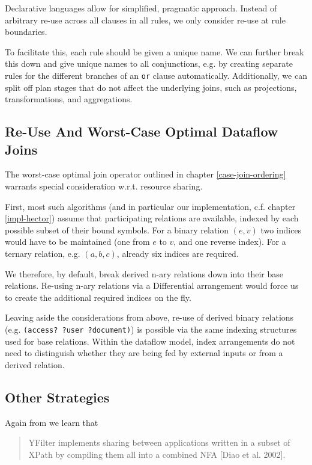 \documentclass[../catalog.tex]{subfiles}
\begin{document}
Declarative languages allow for simplified, pragmatic
approach. Instead of arbitrary re-use across all clauses in all rules,
we only consider re-use at rule boundaries.

To facilitate this, each rule should be given a unique name. We can
further break this down and give unique names to all conjunctions,
e.g. by creating separate rules for the different branches of an
\texttt{or} clause automatically. Additionally, we can split off plan
stages that do not affect the underlying joins, such as projections,
transformations, and aggregations.

\subsection{Re-Use And Worst-Case Optimal Dataflow Joins}

The worst-case optimal join operator outlined in chapter
\ref{case-join-ordering} warrants special consideration
w.r.t. resource sharing.

First, most such algorithms (and in particular our implementation,
c.f. chapter \ref{impl-hector}) assume that participating relations
are available, indexed by each possible subset of their bound
symbols. For a binary relation $(e,v)$ two indices would have to be
maintained (one from $e$ to $v$, and one reverse index). For a ternary
relation, e.g. $(a,b,c)$, already six indices are required.

We therefore, by default, break derived n-ary relations down into
their base relations. Re-using n-ary relations via a Differential
arrangement would force us to create the additional required indices
on the fly.

Leaving aside the considerations from above, re-use of derived binary
relations (e.g. \texttt{(access?  ?user ?document)}) is possible via
the same indexing structures used for base relations. Within the
dataflow model, index arrangements do not need to distinguish whether
they are being fed by external inputs or from a derived relation.

\subsection{Other Strategies}

Again from \cite{hirzel2014catalog} we learn that

\begin{quote}
YFilter implements sharing between applications written in a subset of
XPath by compiling them all into a combined NFA [Diao et al. 2002].
\end{quote}
\end{document}
